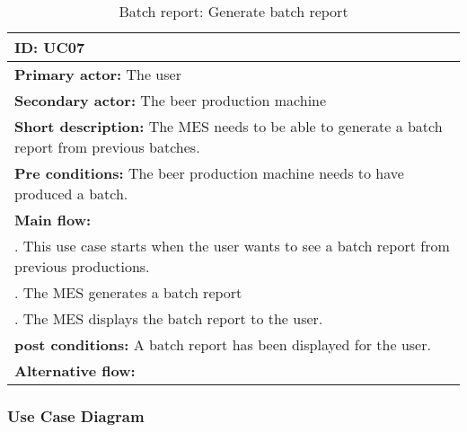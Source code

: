 \begin{table}[ht]
    \begin{tabularx}{\textwidth}{|>{\RaggedRight}X|}
        \hline
        \textbf{ID:} UC07  \\
        \hline
        \textbf{Primary actor:} The user \\
        \hline
        \textbf{Secondary actor:} The beer production machine \\
        \hline
        \textbf{Short description:} The MES needs to be able to generate a batch
        report from previous batches. \\
        \hline
        \textbf{Pre conditions:} The beer production machine needs to have
        produced a batch. \\
        \hline
        \textbf{Main flow:} \\
        	1. This use case starts when the user wants to see a batch report
        	from previous productions. \\
			2. The MES generates a batch report \\
			3. The MES displays the batch report to the user. \\
		\hline
        \textbf{post conditions:} A batch report has been displayed for the
        user. \\
        \hline
        \textbf{Alternative flow:} \\
        \hline
    \end{tabularx}
    \caption{Batch report: Generate batch report}
    \label{table:usecase_batchReport}
\end{table}

\subsubsection{Use Case Diagram}
